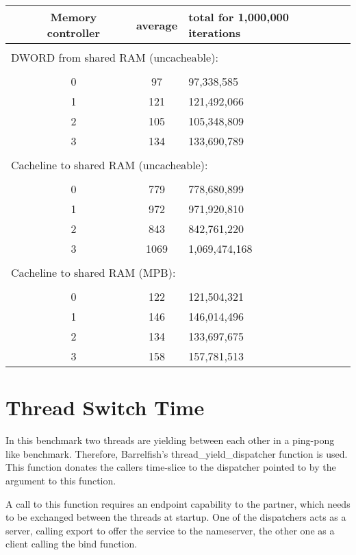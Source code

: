 \documentclass[a4paper,twoside]{report} %
\begin{document}
\begin{center}
\begin{tabular}{cccl}
\hspace{3em} & Memory controller & average & total for 1,000,000 iterations \\
\hline \\
\multicolumn{4}{l}{DWORD from shared RAM (uncacheable):} \\
\\
 & 0 & 97  & 97,338,585 \\
 & 1 & 121 & 121,492,066 \\
 & 2 & 105 & 105,348,809 \\
 & 3 & 134 & 133,690,789 \\
\\
\multicolumn{4}{l}{Cacheline to shared RAM (uncacheable):} \\
\\
 & 0 & 779 & 778,680,899 \\
 & 1 & 972 & 971,920,810 \\
 & 2 & 843 & 842,761,220 \\
 & 3 & 1069 & 1,069,474,168 \\
\\
\multicolumn{4}{l}{Cacheline to shared RAM (MPB):} \\
\\
 & 0 & 122 & 121,504,321 \\
 & 1 & 146 & 146,014,496 \\
 & 2 & 134 & 133,697,675 \\
 & 3 & 158 & 157,781,513 \\
\end{tabular}
\end{center}

\section{Thread Switch Time}

In this benchmark two threads are yielding between each  other in a
ping-pong like benchmark. Therefore, Barrelfish's
thread\_yield\_dispatcher function is used. This function donates the
callers time-slice to the dispatcher pointed to by the argument to this
function.

A call to this function requires an endpoint capability to the
partner, which needs to be exchanged between the threads at
startup. One of the dispatchers acts as a server, calling export to
offer the service to the nameserver, the other one as a client calling
the bind function.
\end{document}
